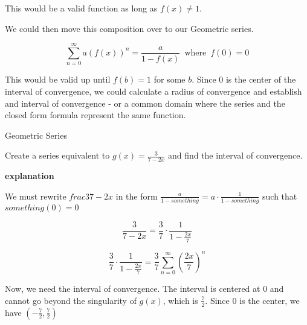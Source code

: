 \documentclass{ximera}
\begin{document}
This would be a valid function as long as $f(x) \ne 1$. 




We could then move this composition over to our Geometric series.




\[   \sum_{n=0}^{\infty} a (f(x))^n =  \frac{a}{1-f(x)}   \, \text{ where } \, f(0) = 0       \]


This would be valid up until $f(b)=1$ for some $b$.  Since $0$ is the center of the interval of convergence, we could calculate a radius of convergence and establish and interval of convergence - or a common domain where the series and the closed form formula represent the same function.












\begin{example} Geometric Series



Create a series equivalent to $g(x)=\frac{3}{7 - 2x}$ and find the interval of convergence.



\textbf{\textcolor{purple!50!blue!90!black}{explanation}}






We must rewrite $frac{3}{7 - 2x}$ in the form $\frac{a}{1-something} = a \cdot \frac{1}{1-something}$ such that $something(0) = 0$




\[     \frac{3}{7 - 2x}  =   \frac{3}{7} \cdot \frac{1}{1 - \frac{2x}{7}}   \]



\[  \frac{3}{7} \cdot \frac{1}{1 - \frac{2x}{7}} =  \frac{3}{7} \sum_{n=0}^{\infty} \left(\frac{2x}{7}\right)^n       \]





Now, we need the interval of convergence.  The interval is centered at $0$ and cannot go beyond the singularity of $g(x)$, which is $\frac{7}{2}$.  Since $0$ is the center, we have $\left(-\frac{7}{2}, \frac{7}{2} \right)$








\end{example}
\end{document}
